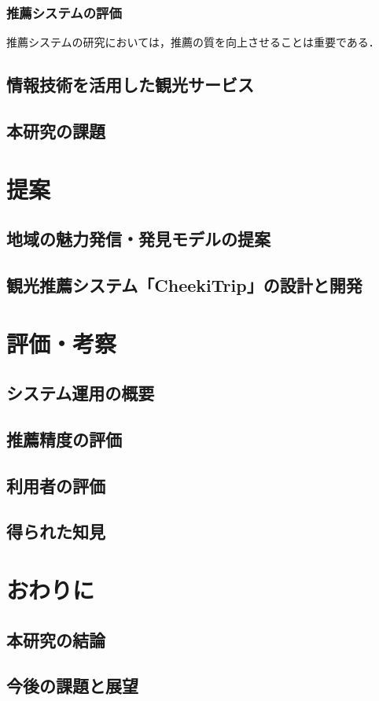 \documentclass{jsarticle}
\begin{document}
\subsubsection{推薦システムの評価}

推薦システムの研究においては，推薦の質を向上させることは重要である．


\subsection{情報技術を活用した観光サービス}
\subsection{本研究の課題}

\section{提案}


\subsection{地域の魅力発信・発見モデルの提案}
\subsection{観光推薦システム「CheekiTrip」の設計と開発}

\section{評価・考察}
\subsection{システム運用の概要}
\subsection{推薦精度の評価}
\subsection{利用者の評価}
\subsection{得られた知見}

\section{おわりに}
\subsection{本研究の結論}
\subsection{今後の課題と展望}

\newpage

\end{document}
